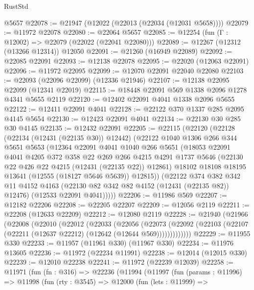 \begin{lexlean}{RustStd}
\begin{coremodule}
    @5657
@22078 := @21947 (@12022 (@22013 (@22034 (@12031 @5658))))
@22079 := @11972 @22078
@22080 := @22064 @5657
@22085 := @12254 (fun (Γ : @12002) => @22079 (@22022 (@22041 @22080)))
@22089 := @12267 (@12312 (@13266 @12314)) @12050
@22091 := @21260 (@16949 @22089)
@22092 := @22085 @22091
@22093 := @12138 @22078
@22095 := @22020 (@12063 @22091)
@22096 := @11972 @22095
@22099 := @12070 @22091 @22040 @22080
@22103 := @22093 (@22096 @22099) (@12336 @21946)
@22107 := @12138 @22095 @22099 (@12341 @22019)
@22115 := @18448 @22091 @569 @1338 @2096 @1278 @4341 @5655 @2119
@22120 := @12402 @22091 @4041 @1338 @2096 @5655
@22122 := @12411 @22091 @4041
@22128 := @22122 @370 @1337 @285 @2095 @4145 @5654
@22130 := @12423 @22091 @4041
@22134 := @22130 @30 @285 @30 @4145
@22135 := @12432 @22091
@22205 := @22115
    (@22120
      (@22128
        (@22134 (@12431 (@22135 @30)) @12442)
        (@22122
          @1040
          @1306
          @266
          @344
          @5651
          @5653
          (@12364
            @22091
            @4041
            @1040
            @266
            @5651
            (@18053
              @22091
              @4041
              @4205
              @372
              @358
              @22
              @269
              @266
              @4215
              @4291
              @1737
              @5646
              (@22130 @22 @426 @22 @4215 (@12431 (@22135 @22)) @12861)
              @18102
              @18108
              @18195
              @13641
              (@12555 (@18127 @5646 @5639))
              @12815))
          (@22122
            @374
            @382
            @342
            @11
            @4152
            @4163
            (@22130 @82 @342 @82 @4152 (@12431 (@22135 @82)) @12476)
            (@12533 @22091 @4041)))))
@22206 := @11986 @569
@22207 := @12182 @22206
@22208 := @22205 @22207
@22209 := @12056 @2119
@22211 := @22208 (@12633 @22209)
@22212 := @12080 @2119
@22228 := @21940
    (@21966
      (@22008
        (@22010
          (@22012
            (@22033
              (@22056
                (@22073
                  (@22092 (@22103 (@22107 (@22211 (@12637 @22212) (@12642 (@12644 @569)))))))))))))
@22229 := @11955 @330
@22233 := @11957 (@11961 @330) (@11967 @330)
@22234 := @11976 @13605
@22236 := @11972 (@22234 @11991)
@22238 := @12014 (@12015 @330)
@22239 := @12010 @22238
@22241 := @11972 (@22239 @12039)
@22258 := @11971
    (fun (fn : @316) =>
    @22236
      (@11994
        (@11997
          (fun (params : @11996) =>
          @11998
            (fun (rty : @3545) =>
            @12000
              (fun (lets : @11999) =>

\end{coremodule}
\end{lexlean}
